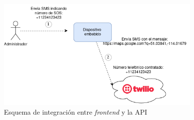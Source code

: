 \begin{figure}[H]
	\centering
	\includegraphics[width=0.9\textwidth]{./Figures/integracion-1.png}
	\caption{Esquema de integración entre \textit{frontend} y la API}
	\label{integracion:3}
\end{figure}

